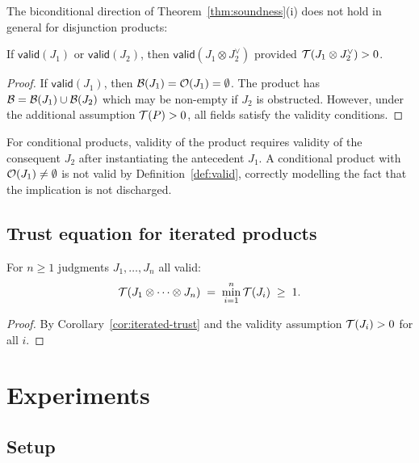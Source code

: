 \documentclass[11pt]{article}
\newcommand{\Jprod}{\mathbin{\otimes}}            %
\newcommand{\JprodN}[2]{#1 \Jprod #2}             %
\newcommand{\Valid}[1]{\mathsf{valid}(#1)}        %
\newcommand{\disj}{\mathbin{\vee}}                %
\begin{document}
The biconditional direction of Theorem~\ref{thm:soundness}(i) does not
hold in general for disjunction products:

\begin{proposition}
\label{prop:disj-sound}
If $\Valid{J_1}$ or $\Valid{J_2}$, then $\Valid{\JprodN{J_1}{J_2}^{\disj}}$
provided $\trust(\JprodN{J_1}{J_2}^{\disj}) > 0$.
\end{proposition}
\begin{proof}
If $\Valid{J_1}$, then $\mathcal{B}(J_1) = \mathcal{O}(J_1) = \emptyset$.
The product has $\mathcal{B} = \mathcal{B}(J_1) \cup \mathcal{B}(J_2)$ which
may be non-empty if $J_2$ is obstructed.  However, under the
additional assumption $\mathcal{T}(P) > 0$, all fields satisfy the
validity conditions.
\end{proof}

\begin{remark}
For conditional products, validity of the product requires validity
of the consequent $J_2$ after instantiating the antecedent $J_1$.
A conditional product with $\mathcal{O}(J_1) \neq \emptyset$ is not valid
by Definition~\ref{def:valid}, correctly modelling the fact that the
implication is not discharged.
\end{remark}

\subsection{Trust equation for iterated products}

\begin{corollary}\label{cor:iterated-sound}
For $n \geq 1$ judgments $J_1, \ldots, J_n$ all valid:
\[
  \trust(J_1 \Jprod \cdots \Jprod J_n)
  \;=\; \min_{i=1}^n \trust(J_i)
  \;\geq\; 1.
\]
\end{corollary}
\begin{proof}
By Corollary~\ref{cor:iterated-trust} and the validity assumption
$\mathcal{T}(J_i) > 0$ for all $i$.
\end{proof}

\section{Experiments}\label{sec:experiments}

\subsection{Setup}
\end{document}
